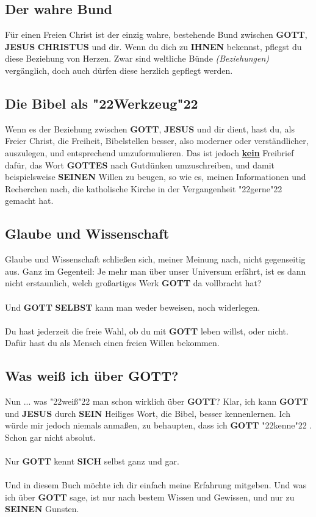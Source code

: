 \documentclass[12pt,a5paper]{article}
\newcommand{\Christus}[0]{\textbf{CHRISTUS}}
\newcommand{\Gottes}[0]{\textbf{GOTTES}}
\newcommand{\Gott}[0]{\textbf{GOTT}}
\newcommand{\Ihnen}[0]{\textbf{IHNEN}}
\newcommand{\Jesus}[0]{\textbf{JESUS}}
\newcommand{\Seinen}[0]{\textbf{SEINEN}}
\newcommand{\Sein}[0]{\textbf{SEIN}}
\newcommand{\Selbst}[0]{\textbf{SELBST}}
\newcommand{\Sich}[0]{\textbf{SICH}}
\newcommand{\q}[1]{\char"22{#1}\char"22 }
\begin{document}
	\subsection{Der wahre Bund}
		F\"ur einen Freien Christ ist der einzig wahre,
		bestehende Bund zwischen {\Gott},
		{\Jesus} {\Christus} und dir.
		Wenn du dich zu {\Ihnen} bekennst,
		pflegst du diese Beziehung von Herzen.
		Zwar sind weltliche B\"unde \textit{(Beziehungen)} verg\"anglich,
		doch auch d\"urfen diese herzlich gepflegt werden.
	
	\subsection{Die Bibel als \q{Werkzeug}}
		Wenn es der Beziehung zwischen {\Gott},
		{\Jesus} und dir dient,
		hast du,
		als Freier Christ,
		die Freiheit,
		Bibelstellen besser,
		also moderner oder verst\"andlicher,
		auszulegen,
		und entsprechend umzuformulieren.
		Das ist jedoch \textbf{\underline{kein}} Freibrief daf\"ur,
		das Wort {\Gottes} nach Gutd\"unken umzuschreiben,
		und damit beispielsweise {\Seinen} Willen zu beugen,
		so wie es,
		meinen Informationen und Recherchen nach,
		die katholische Kirche in der Vergangenheit \q{gerne} gemacht hat.
	
	\subsection{Glaube und Wissenschaft}
		Glaube und Wissenschaft schlie{\ss}en sich,
		meiner Meinung nach,
		nicht gegenseitig aus.
		Ganz im Gegenteil:
		Je mehr man \"uber unser Universum erf\"ahrt,
		ist es dann nicht erstaunlich,
		welch gro{\ss}artiges Werk {\Gott} da vollbracht hat?
		\\
		\\
		Und {\Gott} {\Selbst} kann man weder beweisen,
		noch widerlegen.
		\\
		\\
		Du hast jederzeit die freie Wahl,
		ob du mit {\Gott} leben willst,
		oder nicht.
		Daf\"ur hast du als Mensch einen freien Willen bekommen.
	
	\subsection{Was wei{\ss} ich \"uber {\Gott}?}
		Nun ... was \q{wei{\ss}} man schon wirklich \"uber {\Gott}?
		Klar,
		ich kann {\Gott} und {\Jesus} durch {\Sein} Heiliges Wort,
		die Bibel,
		besser kennenlernen.
		Ich w\"urde mir jedoch niemals anma{\ss}en,
		zu behaupten,
		dass ich {\Gott} \q{kenne}.
		Schon gar nicht absolut.
		\\
		\\
		Nur {\Gott} kennt {\Sich} selbst ganz und gar.
		\\
		\\
		Und in diesem Buch m\"ochte ich dir einfach meine Erfahrung mitgeben.
		Und was ich \"uber {\Gott} sage,
		ist nur nach bestem Wissen und Gewissen,
		und nur zu {\Seinen} Gunsten.
\end{document}
